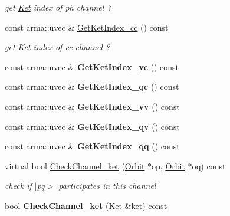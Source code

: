 \begin{DoxyCompactItemize}
\begin{DoxyCompactList}\small\item\em get \hyperlink{classKet}{Ket} index of ph channel ? \end{DoxyCompactList}\item 
\mbox{\label{classTwoBodyChannel_ac976c6b427b6f958d1e3fa1bb0da37c4}} 
const arma\+::uvec \& \hyperlink{classTwoBodyChannel_ac976c6b427b6f958d1e3fa1bb0da37c4}{Get\+Ket\+Index\+\_\+cc} () const
\begin{DoxyCompactList}\small\item\em get \hyperlink{classKet}{Ket} index of cc channel ? \end{DoxyCompactList}\item 
\mbox{\label{classTwoBodyChannel_a0269b5d5d31b4895031573eec92f6139}} 
const arma\+::uvec \& {\bfseries Get\+Ket\+Index\+\_\+vc} () const
\item 
\mbox{\label{classTwoBodyChannel_a910622ad4d7f85363a75bed9953586f0}} 
const arma\+::uvec \& {\bfseries Get\+Ket\+Index\+\_\+qc} () const
\item 
\mbox{\label{classTwoBodyChannel_a432bc92f03756cbb5b2c933ac7267380}} 
const arma\+::uvec \& {\bfseries Get\+Ket\+Index\+\_\+vv} () const
\item 
\mbox{\label{classTwoBodyChannel_a2452be9ce3a7a5f78087c988fde2a387}} 
const arma\+::uvec \& {\bfseries Get\+Ket\+Index\+\_\+qv} () const
\item 
\mbox{\label{classTwoBodyChannel_aee32362443658da1f1d4b42687d6aaf2}} 
const arma\+::uvec \& {\bfseries Get\+Ket\+Index\+\_\+qq} () const
\item 
\mbox{\label{classTwoBodyChannel_aa02ee6c87c6499a93233d58dc6553b48}} 
virtual bool \hyperlink{classTwoBodyChannel_aa02ee6c87c6499a93233d58dc6553b48}{Check\+Channel\+\_\+ket} (\hyperlink{classOrbit}{Orbit} $\ast$op, \hyperlink{classOrbit}{Orbit} $\ast$oq) const
\begin{DoxyCompactList}\small\item\em check if $\vert$pq$>$ participates in this channel \end{DoxyCompactList}\item 
\mbox{\label{classTwoBodyChannel_aee0885f4928d4b834d91120412e684d8}} 
bool {\bfseries Check\+Channel\+\_\+ket} (\hyperlink{classKet}{Ket} \&ket) const
\end{DoxyCompactItemize}
